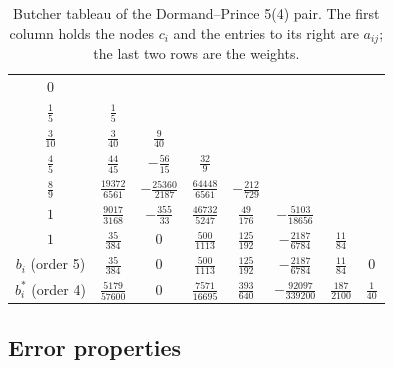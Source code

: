 \begin{table}[ht]
\centering
\small
\renewcommand{\arraystretch}{1.25}
\setlength{\tabcolsep}{4pt}
\begin{tabular}{c|ccccccc}
$0$ & & & & & & & \\
$\tfrac15$ & $\tfrac15$ & & & & & & \\
$\tfrac3{10}$ & $\tfrac3{40}$ & $\tfrac9{40}$ & & & & & \\
$\tfrac45$ & $\tfrac{44}{45}$ & $-\tfrac{56}{15}$ & $\tfrac{32}{9}$ & & & & \\
$\tfrac89$ & $\tfrac{19372}{6561}$ & $-\tfrac{25360}{2187}$ & $\tfrac{64448}{6561}$ & $-\tfrac{212}{729}$ & & & \\
$1$ & $\tfrac{9017}{3168}$ & $-\tfrac{355}{33}$ & $\tfrac{46732}{5247}$ & $\tfrac{49}{176}$ & $-\tfrac{5103}{18656}$ & & \\
$1$ & $\tfrac{35}{384}$ & $0$ & $\tfrac{500}{1113}$ & $\tfrac{125}{192}$ & $-\tfrac{2187}{6784}$ & $\tfrac{11}{84}$ & \\
\hline
$b_i$ (order 5) & $\tfrac{35}{384}$ & $0$ & $\tfrac{500}{1113}$ & $\tfrac{125}{192}$ & $-\tfrac{2187}{6784}$ & $\tfrac{11}{84}$ & $0$ \\
$b_i^{*}$ (order 4) & $\tfrac{5179}{57600}$ & $0$ & $\tfrac{7571}{16695}$ & $\tfrac{393}{640}$ & $-\tfrac{92097}{339200}$ & $\tfrac{187}{2100}$ & $\tfrac1{40}$
\end{tabular}
\caption{Butcher tableau of the Dormand--Prince 5(4) pair. The first column holds the nodes $c_i$ and the entries to its right are $a_{ij}$; the last two rows are the weights.}
\label{tab:dp5}
\end{table}

\subsection{Error properties}
\label{sec:method-error}

